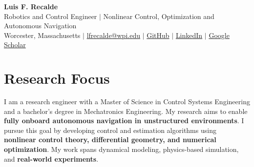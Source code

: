 \documentclass[letterpaper,11pt]{article}
\begin{document}
\begin{center}
\textcolor{HeadingNavy}{\textbf{\Huge Luis F. Recalde}} \\ \vspace{3pt}
\small Robotics and Control Engineer $|$ Nonlinear Control, Optimization and Autonomous Navigation \\ \vspace{3pt}
Worcester, Massachusetts $|$ \href{mailto:lfrecalde@wpi.edu}{lfrecalde@wpi.edu} $|$
\href{https://github.com/lfrecalde1}{GitHub} $|$
\href{https://www.linkedin.com/in/luis-f-recalde-8a6432123}{LinkedIn} $|$
\href{https://scholar.google.com/citations?user=_v1511cAAAAJ}{Google Scholar}
\end{center}
\vspace{-12pt}
\section{Research Focus}
{\small I am a research engineer with a Master of Science in Control Systems Engineering and a bachelor's degree in Mechatronics Engineering.
My research aims to enable \textbf{fully onboard autonomous navigation in unstructured environments}.
I pursue this goal by developing control and estimation algorithms using \textbf{nonlinear control theory, differential geometry, and numerical optimization}.
My work spans dynamical modeling, physics-based simulation, and \textbf{real-world experiments}.\par}
\end{document}

